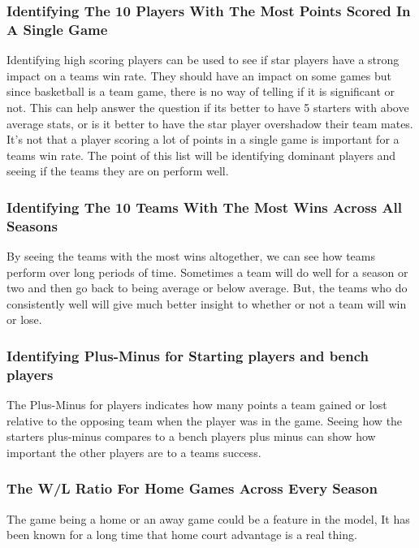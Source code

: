 \documentclass[11pt]{article}
\begin{document}
   



   
    \subsubsection{Identifying The 10 Players With The Most Points Scored In A Single Game}

Identifying high scoring players can be used to see if star players have a strong impact on a teams win rate. They should have an impact on some games but since basketball is a team game, there is no way of telling if it is significant or not. This can help answer the question if its better to have 5 starters with above average stats, or is it better to have the star player overshadow their team mates. It's not that a player scoring a lot of points in a single game is important for a teams win rate. The point of this list will be identifying dominant players and seeing if the teams they are on perform well.
    
   

    
    \medskip
    \medskip


\subsubsection{Identifying The 10 Teams With The Most Wins Across All Seasons}

By seeing the teams with the most wins altogether, we can see how teams perform over long periods of time. Sometimes a team will do well for a season or two and then go back to being average or below average. But, the teams who do consistently well will give much better insight to whether or not a team will win or lose.  

   
    


    

\medskip
\subsubsection{Identifying Plus-Minus for Starting players and bench players}
The Plus-Minus for players indicates how many points a team gained or lost relative to the opposing team when the player was in the game. Seeing how the starters plus-minus compares to a bench players plus minus can show how important the other players are to a teams success.


    \subsubsection{The W/L Ratio For Home Games Across Every Season}
    The game being a home or an away game could be a feature in the model, It has been known for a long time that home court advantage is a real thing.
\end{document}
